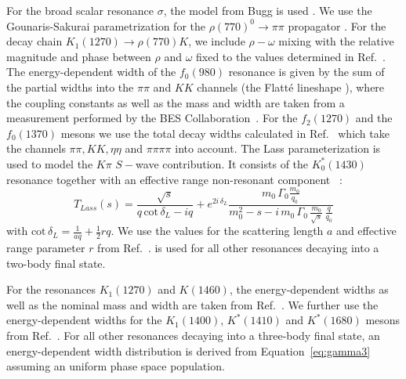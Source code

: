  For the broad scalar resonance $\sigma$,
     		the model from Bugg is used \cite{BuggSigma}.
	We use the Gounaris-Sakurai parametrization for the $\rho(770)^{0} \to \pi \pi$ propagator \cite{GS}.
	For the decay chain $K_1(1270) \to \rho(770) K$, we include $\rho-\omega$ mixing with the relative magnitude and phase between $\rho$ and $\omega$ fixed 
	to the values determined in Ref.~\cite{Schubiger,Aaij:2648586}.
	The energy-dependent width of the $f_{0}(980)$ resonance is given by the sum of the partial widths into the $\pi\pi$ and $KK$ channels (\ie the Flatt\'{e} lineshape \cite{Flatte}),
		where the coupling constants %
		as well as the mass and width are taken from a measurement performed by the BES Collaboration~\cite{Flatte2}.
	     	For the $f_{2}(1270)$ and the $f_{0}(1370)$ mesons we use the total decay widths
		calculated in Ref.~\cite{dArgent:2017gzv} which take the channels $\pi  \pi, K  K, \eta  \eta$ and $\pi \pi \pi \pi$ into account. 	
	The {Lass} parameterization is used to model the $K\pi$ $S-$wave contribution.
	It consists of the $K_0^*(1430)$ resonance together with an effective range non-resonant component ~\cite{Lass,Aston:1987ir,Aubert:2005ce}:
	\begin{equation}
			T_{Lass}(s) = 
			\frac{\sqrt s}{q \, \text{cot}\, \delta_L- i q}   
			+ e^{2i \, \delta_L} \frac{m_0 \, \Gamma_0 \frac{m_0}{q_0}}{m_0^{2} - s - i\,m_{0}\,\Gamma_{0} \, \frac{m_{0}}{\sqrt s} \, \frac{q}{q_{0}}} 
	\label{eq:Lass}
	\end{equation}
	with $\text{cot}\, \delta_L = \frac{1}{aq} + \frac{1}{2} rq$.
	We use the values for the scattering length $a$ and effective range parameter $r$ from Ref.~\cite{Lass,Aston:1987ir}.
		 is used for all other resonances decaying into a two-body final state.

		For the resonances $K_1(1270)$ and $K(1460)$, the energy-dependent widths as well as the nominal mass and width are taken from Ref.~\cite{Aaij:2017kbo}.
		We further use the energy-dependent widths for the $K_1(1400)$, $K^*(1410)$ and $K^*(1680)$ mesons from Ref.~\cite{dArgent:2017gzv}. 	
		For all other resonances decaying into a three-body final state, an energy-dependent width distribution is derived from Equation~\ref{eq:gamma3} assuming an uniform phase space population. 

